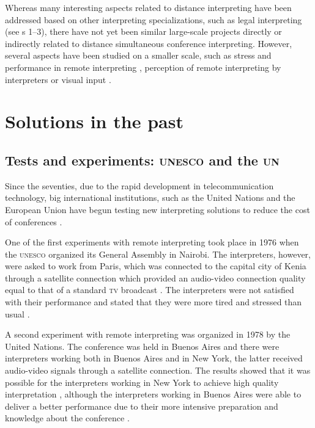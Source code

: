 \documentclass[output=paper]{langsci/langscibook}
\begin{document}
Whereas many interesting aspects related to distance interpreting have been addressed based on other interpreting specializations, such as legal interpreting (see \citeauthor{AVIDICUS1}s 1--3), there have not yet been similar large-scale projects directly or indirectly related to distance simultaneous conference interpreting. However, several aspects have been studied on a smaller scale, such as stress and performance in remote interpreting \citep{Moser-Mercer2003,Roziner2010}, perception of remote interpreting by interpreters \citep{Mouzourakis2006} or visual input \citep{Rennert2008,Luisetto2016}.

\section{Solutions in the past}
\label{sec:ziegler:03}
\subsection{Tests and experiments: \textsc{unesco} and the \textsc{un}}
\label{sub:ziegler:3.1}
Since the seventies, due to the rapid development in telecommunication technology, big international institutions, such as the United Nations and the European Union have begun testing new interpreting solutions to reduce the cost of conferences \citep[26]{UNESCO1987}.

One of the first experiments with remote interpreting took place in 1976 when the \textsc{unesco} organized its General Assembly in Nairobi. The interpreters, however, were asked to work from Paris, which was connected to the capital city of Kenia through a satellite connection which provided an audio-video connection quality equal to that of a standard \textsc{tv} broadcast \citep[30]{Mouzourakis1996}. The interpreters were not satisfied with their performance and stated that they were more tired and stressed than usual \citep[294]{Kurz2000}.

A second experiment with remote interpreting was organized in 1978 by the United Nations. The conference was held in Buenos Aires and there were interpreters working both in Buenos Aires and in New York, the latter received audio-video signals through a satellite connection. The results showed that it was possible for the interpreters working in New York to achieve high quality interpretation \citep[26]{UNESCO1987}, although the interpreters working in Buenos Aires were able to deliver a better performance due to their more intensive preparation and knowledge about the conference \citep[82--90]{Chernov2004}. 
\end{document}
